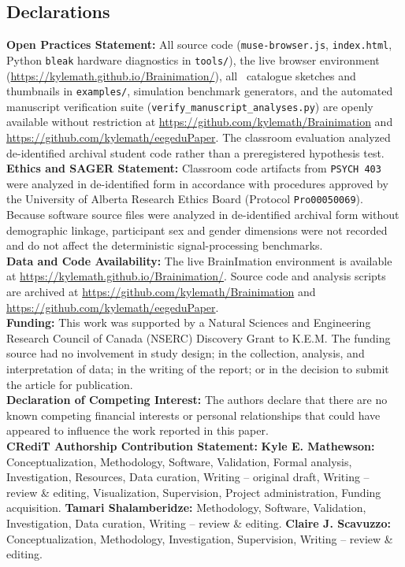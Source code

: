 \documentclass[11pt]{article}
\begin{document}
\subsection*{Declarations}
\noindent\textbf{Open Practices Statement:} All source code (\texttt{muse-browser.js}, \texttt{index.html}, Python \texttt{bleak} hardware diagnostics in \texttt{tools/}), the live browser environment (\url{https://kylemath.github.io/Brainimation/}), all \NCatalogueSketches\ catalogue sketches and thumbnails in \texttt{examples/}, simulation benchmark generators, and the automated manuscript verification suite (\texttt{verify\_manuscript\_analyses.py}) are openly available without restriction at \url{https://github.com/kylemath/Brainimation} and \url{https://github.com/kylemath/eegeduPaper}. The classroom evaluation analyzed de-identified archival student code rather than a preregistered hypothesis test.\\[6pt]
\noindent\textbf{Ethics and SAGER Statement:} Classroom code artifacts from \texttt{PSYCH 403} were analyzed in de-identified form in accordance with procedures approved by the University of Alberta Research Ethics Board (Protocol \texttt{Pro00050069}). Because software source files were analyzed in de-identified archival form without demographic linkage, participant sex and gender dimensions were not recorded and do not affect the deterministic signal-processing benchmarks.\\[6pt]
\noindent\textbf{Data and Code Availability:} The live BrainImation environment is available at \url{https://kylemath.github.io/Brainimation/}. Source code and analysis scripts are archived at \url{https://github.com/kylemath/Brainimation} and \url{https://github.com/kylemath/eegeduPaper}.\\[6pt]
\noindent\textbf{Funding:} This work was supported by a Natural Sciences and Engineering Research Council of Canada (NSERC) Discovery Grant to K.E.M. The funding source had no involvement in study design; in the collection, analysis, and interpretation of data; in the writing of the report; or in the decision to submit the article for publication.\\[6pt]
\noindent\textbf{Declaration of Competing Interest:} The authors declare that there are no known competing financial interests or personal relationships that could have appeared to influence the work reported in this paper.\\[6pt]
\noindent\textbf{CRediT Authorship Contribution Statement:} \textbf{Kyle E. Mathewson:} Conceptualization, Methodology, Software, Validation, Formal analysis, Investigation, Resources, Data curation, Writing -- original draft, Writing -- review \& editing, Visualization, Supervision, Project administration, Funding acquisition. \textbf{Tamari Shalamberidze:} Methodology, Software, Validation, Investigation, Data curation, Writing -- review \& editing. \textbf{Claire J. Scavuzzo:} Conceptualization, Methodology, Investigation, Supervision, Writing -- review \& editing.\\[6pt]
\end{document}
